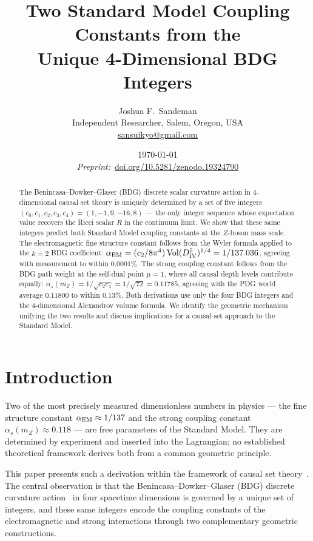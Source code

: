 \documentclass[12pt,a4paper]{article}
\title{\textbf{Two Standard Model Coupling Constants from the\\
Unique 4-Dimensional BDG Integers}}
\author{Joshua F.\ Sandeman\\[4pt]
\small Independent Researcher, Salem, Oregon, USA\\
\small \href{mailto:sansuikyo@gmail.com}{sansuikyo@gmail.com}
}
\date{\today\\[4pt]
\small\textit{Preprint:}~\href{https://doi.org/10.5281/zenodo.19324790}{doi.org/10.5281/zenodo.19324790}}
\theoremstyle{definition}
\begin{document}
\maketitle

\begin{abstract}
The Benincasa--Dowker--Glaser (BDG) discrete scalar curvature action in
4-dimensional causal set theory is uniquely determined by a set of five
integers $(c_0,c_1,c_2,c_3,c_4) = (1,-1,9,-16,8)$ — the only integer
sequence whose expectation value recovers the Ricci scalar $R$ in the
continuum limit.  We show that these same integers predict both Standard
Model coupling constants at the $Z$-boson mass scale.  The electromagnetic
fine structure constant follows from the Wyler formula applied to the $k=2$
BDG coefficient: $\alpha_{\rm EM} = (c_2/8\pi^4)\,\mathrm{Vol}(D_{\rm
IV}^5)^{1/4} = 1/137.036$, agreeing with measurement to within $0.0001\%$.
The strong coupling constant follows from the BDG path weight at the
self-dual point $\mu=1$, where all causal depth levels contribute equally:
$\alpha_s(m_Z) = 1/\!\sqrt{c_2 c_4} = 1/\!\sqrt{72} = 0.11785$,
agreeing with the PDG world average $0.11800$ to within $0.13\%$.  Both
derivations use only the four BDG integers and the 4-dimensional Alexandrov
volume formula.  We identify the geometric mechanism unifying the two
results and discuss implications for a causal-set approach to the Standard
Model.
\end{abstract}

\tableofcontents
\bigskip

\section{Introduction}
\label{sec:intro}

Two of the most precisely measured dimensionless numbers in physics — the
fine structure constant $\alpha_{\rm EM} \approx 1/137$ and the strong
coupling constant $\alpha_s(m_Z) \approx 0.118$ — are free parameters of
the Standard Model.  They are determined by experiment and inserted into
the Lagrangian; no established theoretical framework derives both from a
common geometric principle.

This paper presents such a derivation within the framework of causal set
theory~\cite{Bombelli1987,Sorkin2003}.  The central observation is that
the Benincasa--Dowker--Glaser (BDG) discrete curvature
action~\cite{Benincasa2010,Dowker2013} in four spacetime dimensions is
governed by a unique set of integers, and these same integers encode the
coupling constants of the electromagnetic and strong interactions through
two complementary geometric constructions.
\end{document}
